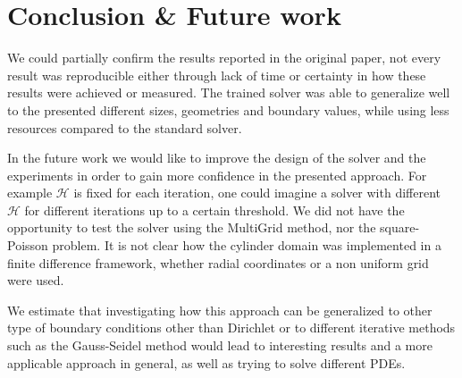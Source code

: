 \section{Conclusion \& Future work}

We could partially confirm the results reported in the original paper, not every result was reproducible either through lack of time or certainty in how these results were achieved or measured. The trained solver was able to generalize well to the presented different sizes, geometries and boundary values, while using less resources compared to the standard solver.

In the future work we would like to improve the design of the solver and the experiments in order to gain more confidence in the presented approach. For example $\mathcal{H}$ is fixed for each iteration, one could imagine a solver with different $\mathcal{H}$ for different iterations up to a certain threshold. We did not have the opportunity to test the solver using the MultiGrid method, nor the square-Poisson problem.
It is not clear how the cylinder domain was implemented in a finite difference framework, whether radial coordinates or a non uniform grid were used.

We estimate that investigating how this approach can be generalized to other type of boundary conditions other than Dirichlet or to different iterative methods such as the Gauss-Seidel method would lead to interesting results and a more applicable approach in general, as well as trying to solve different PDEs.

